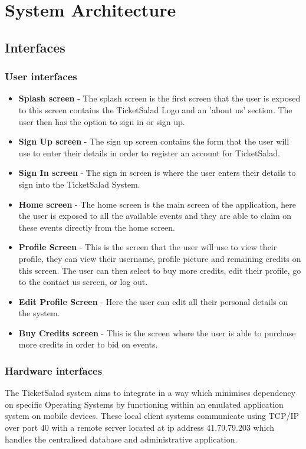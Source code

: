 \documentclass[11pt]{article}
\begin{document}
	\section{System Architecture}
	\subsection{Interfaces}
	\subsubsection{User interfaces}
	\begin{itemize} 
		\item \textbf{Splash screen} - The splash screen is the first screen that the user is exposed to this screen contains the TicketSalad Logo and an 'about us' section. The user then has the option to sign in or sign up.
		\item \textbf{Sign Up screen} - The sign up screen contains the form that the user will use to enter their details in order to register an account for TicketSalad. 
		\item \textbf{Sign In screen} - The sign in screen is where the user enters their details to sign into the TicketSalad System.
		\item \textbf{Home screen} - The home screen is the main screen of the application, here the user is exposed to all the available events and they are able to claim on these events directly from the home screen.
		\item \textbf{Profile Screen} - This is the screen that the user will use to view their profile, they can view their username, profile picture and remaining credits on this screen. The user can then select to buy more credits, edit their profile, go to the contact us screen, or log out.
		\item \textbf{Edit Profile Screen} - Here the user can edit all their personal details on the system.
		\item \textbf{Buy Credits screen} - This is the screen where the user is able to purchase more credits in order to bid on events.
	\end{itemize}
	\subsubsection{Hardware interfaces}
	The TicketSalad system aims to integrate in a way which minimises dependency on specific Operating Systems by functioning within an emulated application system on mobile devices. These local client systems communicate using TCP/IP over port 40 with a remote server located at ip address 41.79.79.203 which handles the centralised database and administrative application.   
\end{document}
